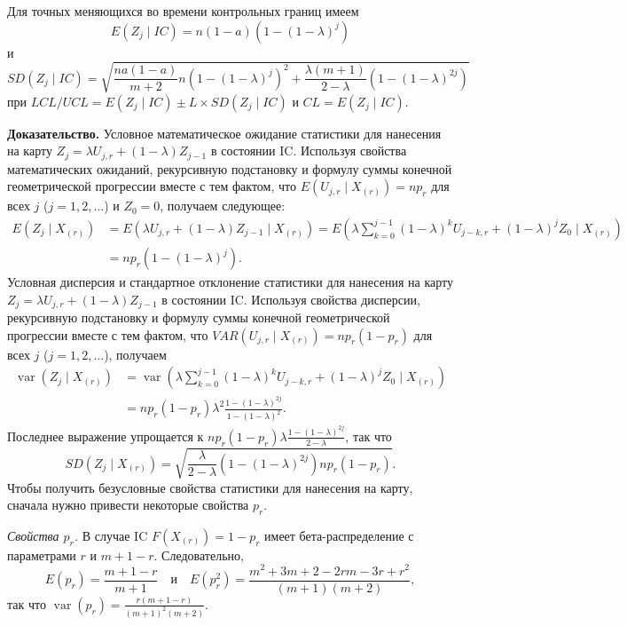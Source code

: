 Для точных меняющихся во времени контрольных границ имеем
\[
	E(Z_j \mid IC) = n(1 - a)\left( 1 - (1 - \lambda)^j \right)
\]
и
\[
	SD(Z_j \mid IC) = \sqrt{\frac{na(1 - a)}{m + 2}n\left( 1 - (1 - \lambda)^j \right)^2 + \frac{\lambda(m + 1)}{2 - \lambda}\left( 1 - (1 - \lambda)^{2j} \right)}
\]
при \(LCL/UCL = E(Z_j \mid IC) \pm L \times SD(Z_j \mid IC)\) и \(CL = E(Z_j \mid IC)\).

\noindent\textbf{Доказательство.} Условное математическое ожидание статистики для нанесения на карту \(Z_j = \lambda U_{j,r} + (1 - \lambda)Z_{j-1}\) в состоянии IC. Используя свойства математических ожиданий, рекурсивную подстановку и формулу суммы конечной геометрической прогрессии вместе с тем фактом, что \(E\left( U_{j,r} \mid X_{(r)} \right) = np_r\) для всех \(j\) (\(j = 1, 2, \ldots\)) и \(Z_0 = 0\), получаем следующее:
\begin{align*}
	E\left( Z_j \mid X_{(r)} \right) &= E\left( \lambda U_{j,r} + (1 - \lambda)Z_{j-1} \mid X_{(r)} \right) = E\left( \lambda\sum_{k=0}^{j-1}(1 - \lambda)^k U_{j-k,r} + (1 - \lambda)^j Z_0 \mid X_{(r)} \right) \\
	&= np_r\left( 1 - (1 - \lambda)^j \right).
\end{align*}
Условная дисперсия и стандартное отклонение статистики для нанесения на карту \(Z_j = \lambda U_{j,r} + (1 - \lambda)Z_{j-1}\) в состоянии IC. Используя свойства дисперсии, рекурсивную подстановку и формулу суммы конечной геометрической прогрессии вместе с тем фактом, что \(VAR\left( U_{j,r} \mid X_{(r)} \right) = np_r(1 - p_r)\) для всех \(j\) (\(j = 1, 2, \ldots\)), получаем
\begin{align*}
	\operatorname{var}\left( Z_j \mid X_{(r)} \right) &= \operatorname{var}\left( \lambda\sum_{k=0}^{j-1}(1 - \lambda)^k U_{j-k,r} + (1 - \lambda)^j Z_0 \mid X_{(r)} \right) \\
	&= np_r(1 - p_r)\lambda^2\frac{1 - (1 - \lambda)^{2j}}{1 - (1 - \lambda)^2}.
\end{align*}
Последнее выражение упрощается к \(np_r(1 - p_r)\lambda\frac{1 - (1 - \lambda)^{2j}}{2 - \lambda}\), так что
\[
	SD\left( Z_j \mid X_{(r)} \right) = \sqrt{\frac{\lambda}{2 - \lambda}\left( 1 - (1 - \lambda)^{2j} \right)np_r(1 - p_r)}.
\]
Чтобы получить безусловные свойства статистики для нанесения на карту, сначала нужно привести некоторые свойства \(p_r\).

\emph{Свойства \(p_r\).} В случае IC \(F\left( X_{(r)} \right) = 1 - p_r\) имеет бета-распределение с параметрами \(r\) и \(m + 1 - r\). Следовательно,
\[
	E(p_r) = \frac{m + 1 - r}{m + 1} \quad \text{и} \quad E\left( p_r^2 \right) = \frac{m^2 + 3m + 2 - 2rm - 3r + r^2}{(m + 1)(m + 2)},
\]
так что \(\operatorname{var}(p_r) = \frac{r(m + 1 - r)}{(m + 1)^2(m + 2)}\).

